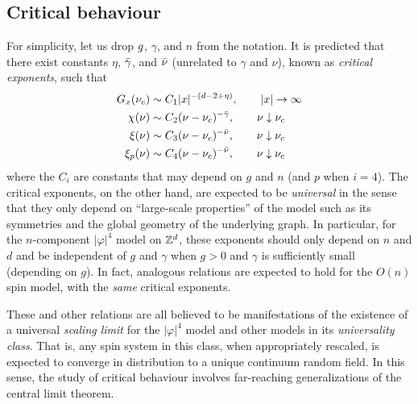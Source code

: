 
\subsection{Critical behaviour}

For simplicity, let us drop $g$, $\gamma$, and $n$ from the notation.
It is predicted that there exist constants $\eta$, $\bar\gamma$, and $\bar\nu$
(unrelated to $\gamma$ and $\nu$), known as \emph{critical exponents}, such that
\begin{align}
\label{e:Gpred}
G_x(\nu_c)
	&\sim
C_1 |x|^{-(d - 2 + \eta)},
	\qquad
|x|\rightarrow\infty \\
\chi(\nu)
	&\sim
C_2 (\nu - \nu_c)^{-\bar\gamma},
	\qquad
\nu\downarrow\nu_c \\
\xi(\nu)
	&\sim
C_3 (\nu - \nu_c)^{-\bar\nu},
	\qquad
\nu\downarrow\nu_c \\
\label{e:xippred}
\xi_p(\nu)
	&\sim
C_4 (\nu - \nu_c)^{-\bar\nu},
	\qquad
\nu\downarrow\nu_c
\end{align}
where the $C_i$ are constants that may depend on $g$ and $n$ (and $p$ when $i = 4$).
The critical exponents, on the other hand, are expected to be \emph{universal} in the
sense that they only depend on ``large-scale properties'' of the model such as its
symmetries and the global geometry of the underlying graph. In particular,
for the $n$-component $|\varphi|^4$ model on ${ {{\mathbb Z}}^d }$, these exponents should only
depend on $n$ and $d$ and be independent of $g$ and $\gamma$ when $g > 0$ and $\gamma$
is sufficiently small (depending on $g$). In fact,
analogous relations are expected to hold for the $O(n)$ spin model, with the
\emph{same} critical exponents.

These and other relations are all believed to be manifestations of the existence of
a universal \emph{scaling limit} for the $|\varphi|^4$ model and other models in its
\emph{universality class}. That is, any spin system in this class, when appropriately
rescaled, is expected to converge in distribution to a unique continuum random field.
In this sense, the study of critical behaviour involves far-reaching generalizations
of the central limit theorem.

